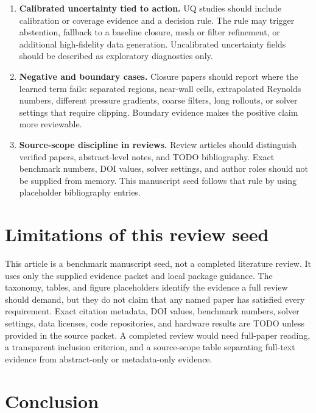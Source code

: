\documentclass[11pt]{article}
\begin{document}
\begin{enumerate}
\item \textbf{Calibrated uncertainty tied to action.} UQ studies should include calibration or coverage evidence and a decision rule. The rule may trigger abstention, fallback to a baseline closure, mesh or filter refinement, or additional high-fidelity data generation. Uncalibrated uncertainty fields should be described as exploratory diagnostics only.

\item \textbf{Negative and boundary cases.} Closure papers should report where the learned term fails: separated regions, near-wall cells, extrapolated Reynolds numbers, different pressure gradients, coarse filters, long rollouts, or solver settings that require clipping. Boundary evidence makes the positive claim more reviewable.

\item \textbf{Source-scope discipline in reviews.} Review articles should distinguish verified papers, abstract-level notes, and TODO bibliography. Exact benchmark numbers, DOI values, solver settings, and author roles should not be supplied from memory. This manuscript seed follows that rule by using placeholder bibliography entries.
\end{enumerate}

\section{Limitations of this review seed}

This article is a benchmark manuscript seed, not a completed literature review. It uses only the supplied evidence packet and local package guidance. The taxonomy, tables, and figure placeholders identify the evidence a full review should demand, but they do not claim that any named paper has satisfied every requirement. Exact citation metadata, DOI values, benchmark numbers, solver settings, data licenses, code repositories, and hardware results are TODO unless provided in the source packet. A completed review would need full-paper reading, a transparent inclusion criterion, and a source-scope table separating full-text evidence from abstract-only or metadata-only evidence.

\section{Conclusion}
\end{document}
